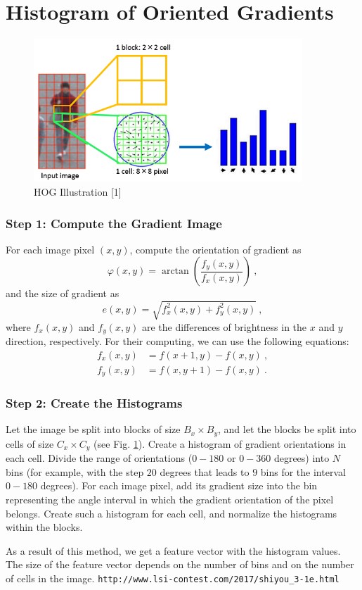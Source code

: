 \documentclass[12pt]{article}
\begin{document}
\section*{Histogram of Oriented Gradients}
\begin{figure}[h!]
\center
\includegraphics[width=0.9\textwidth]{hog_scheme.png}
\caption{HOG Illustration [1]}
\label{fig:hog}
\end{figure}
\subsubsection*{Step 1: Compute the Gradient Image}
For each image pixel $(x,y)$, compute the orientation of gradient as 
\begin{equation}
\varphi(x,y) = \arctan \left( \frac{f_y(x,y)}{f_x(x,y)} \right) \:,
\end{equation}
and the size of gradient as
\begin{equation}
e(x,y) = \sqrt{f_x^2(x,y) + f_y^2(x,y)} \:,
\end{equation}
where $f_x(x,y)$ and $f_y(x,y)$ are the differences of brightness in the $x$ and $y$ direction, respectively.
For their computing, we can use the following equations:
\begin{eqnarray}
f_x(x,y) &= f(x+1,y) - f(x,y) \:, \\
f_y(x,y) &= f(x,y+1) - f(x,y) \:.
\end{eqnarray}

\subsubsection*{Step 2: Create the Histograms}
Let the image be split into blocks of size $B_x \times B_y$, and let the blocks be split into cells of size $C_x \times C_y$ (see Fig. \ref{fig:hog}).
Create a histogram of gradient orientations in each cell.
Divide the range of orientations ($0-180$ or $0-360$ degrees) into $N$ bins (for example, with the step $20$ degrees that leads to $9$ bins for the interval $0-180$ degrees).
For each image pixel, add its gradient size into the bin representing the angle interval in which the gradient orientation of the pixel belongs.
Create such a histogram for each cell, and normalize the histograms within the blocks.

As a result of this method, we get a feature vector with the histogram values.
The size of the feature vector depends on the number of bins and on the number of cells in the image.
\newline
\newline
[1] \texttt{http://www.lsi-contest.com/2017/shiyou\_3-1e.html}
\end{document}
